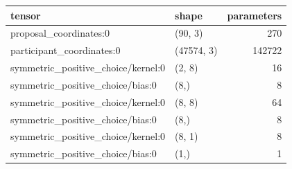 \begin{tabular}{llr}
\toprule
tensor & shape & parameters \\
\midrule
proposal_coordinates:0 & (90, 3) & 270 \\
participant_coordinates:0 & (47574, 3) & 142722 \\
symmetric_positive_choice/kernel:0 & (2, 8) & 16 \\
symmetric_positive_choice/bias:0 & (8,) & 8 \\
symmetric_positive_choice/kernel:0 & (8, 8) & 64 \\
symmetric_positive_choice/bias:0 & (8,) & 8 \\
symmetric_positive_choice/kernel:0 & (8, 1) & 8 \\
symmetric_positive_choice/bias:0 & (1,) & 1 \\
\bottomrule
\end{tabular}
